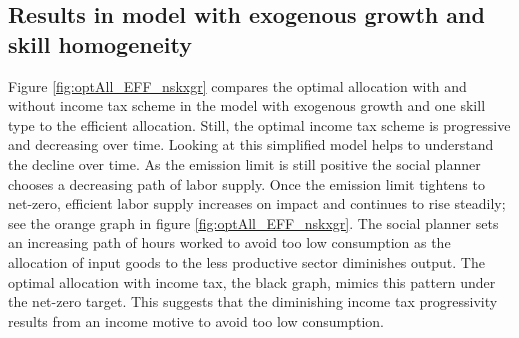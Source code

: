 \subsection{Results in model with exogenous growth and skill homogeneity}

Figure \ref{fig:optAll_EFF_nskxgr} compares the optimal allocation with and without income tax scheme in the model with exogenous growth and one skill type to the efficient allocation. 
Still, the optimal income tax scheme is progressive and decreasing over time. Looking at this simplified model helps to understand the decline over time. As the emission limit is still positive the social planner chooses a decreasing path of labor supply. Once the emission limit tightens to net-zero, efficient labor supply increases on impact and continues to rise steadily; see the orange graph in figure \ref{fig:optAll_EFF_nskxgr}. 
The social planner sets an increasing path of hours worked to avoid too low consumption as the allocation of input goods to the less productive sector diminishes output. 
The optimal allocation with income tax, the black graph, mimics this pattern under the net-zero target. This suggests that the diminishing income tax progressivity results from an income motive to avoid too low consumption. 

